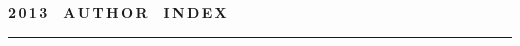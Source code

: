 
\def\stat{cont-e}
{%
\raggedleft\Large \bf%
2\,0\,1\,3\ \ A\,U\,T\,H\,O\,R\ \ I\,N\,D\,E\,X \vskip 17pt
    \hrule
    \par
{} }

\label{st\stat}

\def\tit{\ }

\def\aut{\ }
\def\auf{\ }

\def\leftkol{\ } %

\def\rightkol{\ } %

\titele{\tit}{\aut}{\auf}{\leftkol}{\rightkol}

\def\leftfootline{\small{\textbf{\thepage}
\hfill INFORMATIKA I EE PRIMENENIYA~--- INFORMATICS AND APPLICATIONS\ \ \ 2013\ 
\ \ volume~7\ \ \ issue\ 4}
}%
 \def\rightfootline{\small{INFORMATIKA I EE PRIMENENIYA~--- INFORMATICS AND APPLICATIONS\ \ \ 2013\ \ \ volume~7\ \ \ issue\ 4
\hfill \textbf{\thepage}}}

\vspace*{-12pt}
\vspace*{-12pt}

